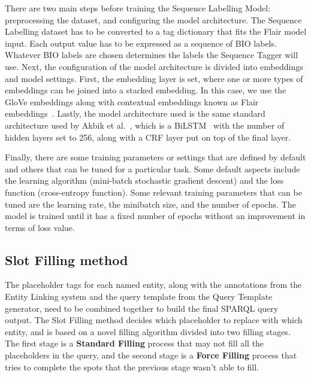There are two main steps before training the Sequence Labelling Model: preprocessing the 
dataset, and configuring the model architecture. The Sequence Labelling dataset has to be 
converted to a tag dictionary that fits the Flair model input. Each output value has to be 
expressed as a sequence of BIO labels. Whatever BIO labels are chosen determines the labels 
the Sequence Tagger will use. Next, the configuration of the model architecture is divided 
into embeddings and model settings. First, the embedding layer is set, where one or more 
types of embeddings can be joined into a stacked embedding. In this case, we use the GloVe 
embeddings along with contextual embeddings known as Flair embeddings~\cite{seqlab:flair-AkbikBBRSV19}. 
Lastly, the model architecture used is the same standard architecture used by 
Akbik et al.~\cite{seqlab:contextual-emb-AkbikBV18}, which is a BiLSTM~\cite{seqlab:HuangXY15} 
with the number of hidden layers set to 256, along with a CRF layer put on top of the final 
layer. 

Finally, there are some training parameters or settings that are defined by default and 
others that can be tuned for a particular task. Some default aspects include the learning 
algorithm (mini-batch stochastic gradient descent) and the loss function (cross-entropy 
function). Some relevant training parameters that can be tuned are the learning rate, the 
minibatch size, and the number of epochs. The model is trained until it has a fixed number of 
epochs without an improvement in terms of loss value.

\subsection{Slot Filling method}
The placeholder tags for each named entity, along with the annotations from the Entity 
Linking system and the query template from the Query Template generator, need to be combined 
together to build the final SPARQL query output. The Slot Filling method decides which 
placeholder to replace with which entity, and is based on a novel filling algorithm divided 
into two filling stages. The first stage is a \textbf{Standard Filling} process that may not 
fill all the placeholders in the query, and the second stage is a \textbf{Force Filling} 
process that tries to complete the spots that the previous stage wasn’t able to fill.

